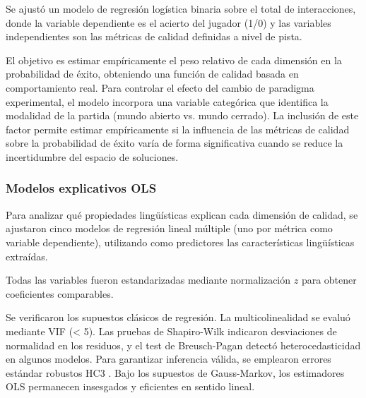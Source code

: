 \documentclass[../main.tex]{subfiles}
\begin{document}
Se ajustó un modelo de regresión logística binaria sobre el total de interacciones, donde la variable dependiente es el acierto del jugador (1/0) y las variables independientes son las métricas de calidad definidas a nivel de pista.

El objetivo es estimar empíricamente el peso relativo de cada dimensión en la probabilidad de éxito, obteniendo una función de calidad basada en comportamiento real. Para controlar el efecto del cambio de paradigma experimental, el modelo incorpora una variable categórica que identifica la modalidad de la partida (mundo abierto vs. mundo cerrado). La inclusión de este factor permite estimar empíricamente si la influencia de las métricas de calidad sobre la probabilidad de éxito varía de forma significativa cuando se reduce la incertidumbre del espacio de soluciones.

\subsubsection{Modelos explicativos OLS}

Para analizar qué propiedades lingüísticas explican cada dimensión de calidad, se ajustaron cinco modelos de regresión lineal múltiple (uno por métrica como variable dependiente), utilizando como predictores las características lingüísticas extraídas.

Todas las variables fueron estandarizadas mediante normalización $z$ para obtener coeficientes comparables.

Se verificaron los supuestos clásicos de regresión. La multicolinealidad se evaluó mediante VIF (< 5). Las pruebas de Shapiro-Wilk indicaron desviaciones de normalidad en los residuos, y el test de Breusch-Pagan detectó heterocedasticidad en algunos modelos. Para garantizar inferencia válida, se emplearon errores estándar robustos HC3 \cite{mackinnon1985}. Bajo los supuestos de Gauss-Markov, los estimadores OLS permanecen insesgados y eficientes en sentido lineal.
\end{document}
